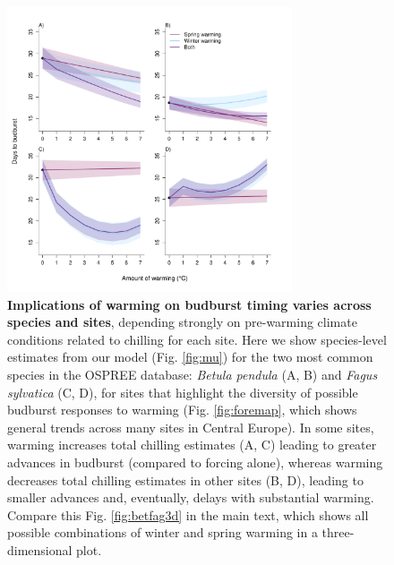 \documentclass{article}
\begin{document}
\begin{figure}[h!]
\centering
\noindent \includegraphics[width=0.75\textwidth]{..//..//analyses/bb_analysis/figures/forecasting/tempforecastbothspp_1_7_degwarm.pdf}
\caption{\textbf{Implications of warming on budburst timing varies across species and sites}, depending strongly on pre-warming climate conditions related to chilling for each site. Here we show species-level estimates from our model (Fig. \ref{fig:mu}) for the two most common species in the OSPREE database: \emph{Betula pendula} (A, B) and \emph{Fagus sylvatica} (C, D), for sites that highlight the diversity of possible budburst responses to warming (Fig. \ref{fig:foremap}, which shows general trends across many sites in Central Europe). In some sites, warming increases total chilling estimates (A, C) leading to greater advances in budburst (compared to forcing alone), whereas warming decreases total chilling estimates in other sites (B, D), leading to smaller advances and, eventually, delays with substantial warming. Compare this Fig. \ref{fig:betfag3d} in the main text, which shows all possible combinations of winter and spring warming in a three-dimensional plot.}
\label{fig:betfag2d}
\end{figure}
\end{document}
